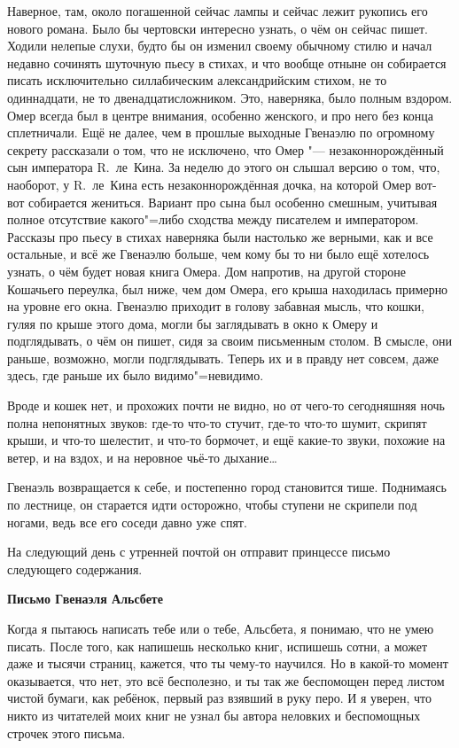 Наверное, там, около погашенной сейчас лампы и сейчас лежит рукопись его нового
романа.
Было бы чертовски интересно узнать, о чём он сейчас пишет.
Ходили нелепые слухи, будто бы он изменил своему обычному стилю и начал недавно
сочинять шуточную пьесу в стихах, и что вообще отныне он собирается писать
исключительно силлабическим александрийским стихом, не то одиннадцати, не то
двенадцатисложником.
Это, наверняка, было полным вздором.
Омер всегда был в центре внимания, особенно женского, и про него без конца
сплетничали.
Ещё не далее, чем в прошлые выходные Гвенаэлю по огромному секрету рассказали о
том, что не исключено, что Омер "--- незаконнорождённый сын императора
R.~ле~Кина.
За неделю до этого он слышал версию о том, что, наоборот, у R.~ле~Кина есть
незаконнорождённая дочка, на которой Омер вот-вот собирается жениться.
Вариант про сына был особенно смешным, учитывая полное отсутствие какого"=либо
сходства между писателем и императором.
Рассказы про пьесу в стихах наверняка были настолько же верными, как и все
остальные, и всё же Гвенаэлю больше, чем кому бы то ни было ещё хотелось узнать,
о чём будет новая книга Омера.
Дом напротив, на другой стороне Кошачьего переулка, был ниже, чем дом Омера,
его крыша находилась примерно на уровне его окна.
Гвенаэлю приходит в голову забавная мысль, что кошки, гуляя по крыше этого дома,
могли бы заглядывать в окно к Омеру и подглядывать, о чём он пишет, сидя за своим
письменным столом.
В смысле, они раньше, возможно, могли подглядывать.
Теперь их и в правду нет совсем, даже здесь, где раньше их было видимо"=невидимо.

Вроде и кошек нет, и прохожих почти не видно, но от чего-то сегодняшняя ночь
полна непонятных звуков: где-то что-то стучит, где-то что-то шумит, скрипят
крыши, и что-то шелестит, и что-то бормочет, и ещё какие-то звуки, похожие на
ветер, и на вздох, и на неровное чьё-то дыхание\ldots

Гвенаэль возвращается к себе, и постепенно город становится тише.
Поднимаясь по лестнице, он старается идти осторожно, чтобы ступени не скрипели
под ногами, ведь все его соседи давно уже спят.

На следующий день с утренней почтой он отправит принцессе письмо следующего
содержания.

\medskip
\begin{center}
\textbf{Письмо Гвенаэля Альсбете}
\end{center}

\medskip
Когда я пытаюсь написать тебе или о тебе, Альсбета, я понимаю, что не умею
писать.
После того, как напишешь несколько книг, испишешь сотни, а может даже и тысячи
страниц, кажется, что ты чему-то научился.
Но в какой-то момент оказывается, что нет, это всё бесполезно, и ты так же
беспомощен перед листом чистой бумаги, как ребёнок, первый раз взявший в руку
перо.
И я уверен, что никто из читателей моих книг не узнал бы автора неловких и
беспомощных строчек этого письма.

